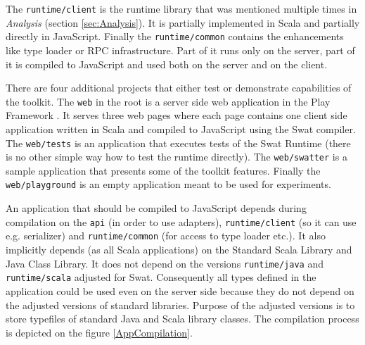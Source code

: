 \documentclass[12pt,a4paper]{report}
\begin{document}
The \texttt{runtime/client} is the runtime library that was mentioned multiple times in {\it Analysis} (section \ref{sec:Analysis}). It is partially implemented in Scala and partially directly in JavaScript. Finally the \texttt{runtime/common} contains the enhancements like type loader or RPC infrastructure. Part of it runs only on the server, part of it is compiled to JavaScript and used both on the server and on the client.

There are four additional projects that either test or demonstrate capabilities of the toolkit. The \texttt{web} in the root is a server side web application in the Play Framework \cite{Play}. It serves three web pages where each page contains one client side application written in Scala and compiled to JavaScript using the Swat compiler. The \texttt{web/tests} is an application that executes tests of the Swat Runtime (there is no other simple way how to test the runtime directly). The \texttt{web/swatter} is a sample application that presents some of the toolkit features. Finally the \texttt{web/playground} is an empty application meant to be used for experiments.

An application that should be compiled to JavaScript depends during compilation on the \texttt{api} (in order to use adapters), \texttt{runtime/client} (so it can use e.g. serializer) and \texttt{runtime/common} (for access to type loader etc.). It also implicitly depends (as all Scala applications) on the Standard Scala Library and Java Class Library. It does not depend on the versions \texttt{runtime/java} and \texttt{runtime/scala} adjusted for Swat. Consequently all types defined in the application could be used even on the server side because they do not depend on the adjusted versions of standard libraries. Purpose of the adjusted versions is to store typefiles of standard Java and Scala library classes. The compilation process is depicted on the figure \ref{AppCompilation}.
\end{document}

